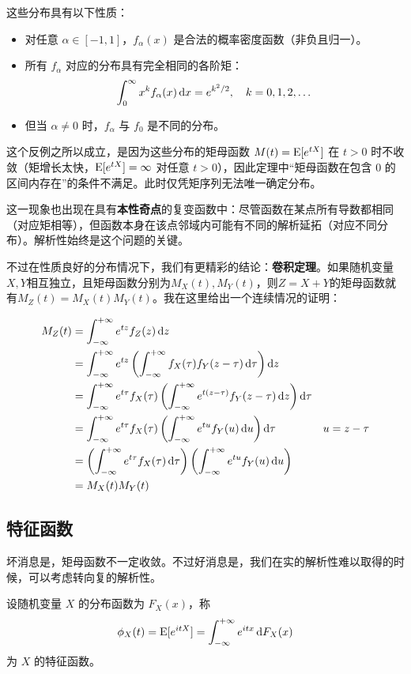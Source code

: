 这些分布具有以下性质：
\begin{itemize}
    \item 对任意 $\alpha \in [-1, 1]$，$f_\alpha(x)$ 是合法的概率密度函数（非负且归一）。
    \item 所有 $f_\alpha$ 对应的分布具有完全相同的各阶矩：
    \[
    \int_0^\infty x^k f_\alpha(x) \mathop{}\!\mathrm{d} x = e^{k^2/2}, \quad k = 0, 1, 2, \dots
    \]
    \item 但当 $\alpha \neq 0$ 时，$f_\alpha$ 与 $f_0$ 是不同的分布。
\end{itemize}

这个反例之所以成立，是因为这些分布的矩母函数 $M(t) = \operatorname{E}[e^{tX}]$ 在 $t>0$ 时不收敛（矩增长太快，$\operatorname{E}[e^{tX}] = \infty$ 对任意 $t>0$），因此定理中“矩母函数在包含 $0$ 的区间内存在”的条件不满足。此时仅凭矩序列无法唯一确定分布。

这一现象也出现在具有\textbf{本性奇点}的复变函数中：尽管函数在某点所有导数都相同（对应矩相等），但函数本身在该点邻域内可能有不同的解析延拓（对应不同分布）。解析性始终是这个问题的关键。

不过在性质良好的分布情况下，我们有更精彩的结论：\textbf{卷积定理}。如果随机变量$X,Y$相互独立，且矩母函数分别为$M_X(t),M_Y(t)$，则$Z=X+Y$的矩母函数就有$M_Z(t)=M_X(t)M_Y(t)$。我在这里给出一个连续情况的证明：

\begin{align*}
M_Z(t)&= \int_{-\infty}^{+\infty}e^{tz}f_Z(z)\dif z\\
&= \int_{-\infty}^{+\infty}e^{tz}\left(\int_{-\infty}^{+\infty}f_X(\tau)f_Y(z-\tau)\dif \tau\right)\dif z\\
&= \int_{-\infty}^{+\infty}e^{t\tau}f_X(\tau)\left(\int_{-\infty}^{+\infty}e^{t(z-\tau)}f_Y(z-\tau)\dif z\right)\dif \tau\\
&= \int_{-\infty}^{+\infty}e^{t\tau}f_X(\tau)\left(\int_{-\infty}^{+\infty}e^{tu}f_Y(u)\dif u\right)\dif \tau & u= z-\tau\\
&= \left(\int_{-\infty}^{+\infty}e^{t\tau}f_X(\tau)\dif \tau\right)\left(\int_{-\infty}^{+\infty}e^{tu}f_Y(u)\dif u\right)\\
&= M_X(t)M_Y(t)
\end{align*}

\subsection{特征函数}
坏消息是，矩母函数不一定收敛。不过好消息是，我们在实的解析性难以取得的时候，可以考虑转向复的解析性。

设随机变量 $X$ 的分布函数为 $F_X(x)$，称
\[
\phi_X(t) = \operatorname{E}[e^{itX}] = \int_{-\infty}^{+\infty} e^{itx} \mathop{}\!\mathrm{d} F_X(x)
\]
为 $X$ 的特征函数。

